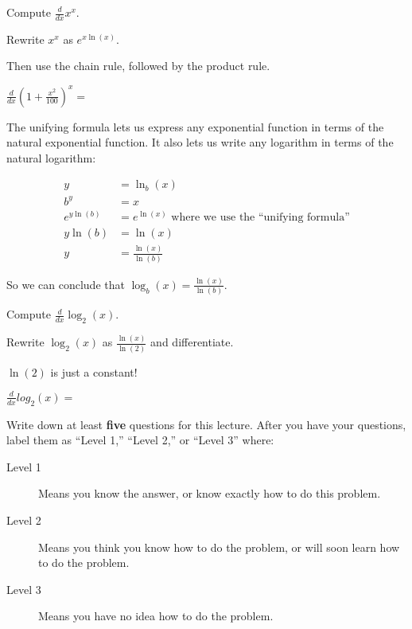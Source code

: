 \documentclass{ximera}
\begin{document}
\begin{question}
  Compute $\frac{d}{dx} x^x$.
  
  \begin{hint}
    Rewrite $x^x$ as $e^{x\ln(x)}$.
  \end{hint}
  \begin{hint}
    Then use the chain rule, followed by the product rule.
  \end{hint}
  $\frac{d}{dx} (1+\frac{x^2}{100})^x = $ 
\end{question}

The unifying formula lets us express any exponential function in terms of the natural exponential function.  It also lets us write any logarithm in terms of the natural logarithm:

\begin{align*}
	y &= \ln_b(x)\\
	b^y &=  x\\
	e^{y\ln(b)} &= e^{\ln(x)} \text{ where we use the ``unifying formula''}\\
	y\ln(b) &= \ln(x)\\
	y &= \frac{\ln(x)}{\ln(b)}
\end{align*}

So we can conclude that $\log_b(x) = \frac{\ln(x)}{\ln(b)}$.

\begin{question}
	Compute $\frac{d}{dx} \log_2(x)$.
	\begin{hint}
	  Rewrite $\log_2(x)$ as $\frac{\ln(x)}{\ln(2)}$ and differentiate.
	\end{hint}
	\begin{hint}
	  $\ln(2)$ is just a constant!
	\end{hint}
	$\frac{d}{dx} log_2(x)=$
\end{question}


\begin{question}

Write down at least \textbf{five} questions for this lecture. After
you have your questions, label them as ``Level 1,'' ``Level 2,'' or ``Level 3'' where:
\begin{description}
\item[Level 1] Means you know the answer, or know exactly how to do this problem.
\item[Level 2] Means you think you know how to do the problem, or will soon learn how to do the problem.
\item[Level 3] Means you have no idea how to do the problem. 
\end{description}
  \begin{freeResponse}
  \end{freeResponse}
\end{question}
\end{document}
